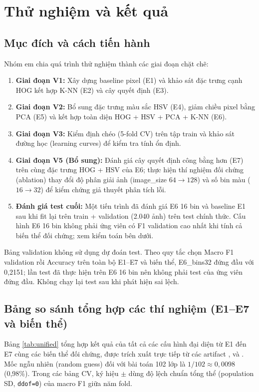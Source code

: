 \chapter{Thử nghiệm và kết quả}
\sloppy
\section{Mục đích và cách tiến hành}
Nhóm em chia quá trình thử nghiệm thành các giai đoạn chặt chẽ:
\begin{enumerate}
    \item \textbf{Giai đoạn V1:} Xây dựng baseline pixel (E1) và khảo sát đặc trưng cạnh HOG kết hợp K-NN (E2) và cây quyết định (E3).
    \item \textbf{Giai đoạn V2:} Bổ sung đặc trưng màu sắc HSV (E4), giảm chiều pixel bằng PCA (E5) và kết hợp toàn diện HOG + HSV + PCA + K-NN (E6).
    \item \textbf{Giai đoạn V3:} Kiểm định chéo (5-fold CV) trên tập train và khảo sát đường học (learning curves) để kiểm tra tính ổn định.
    \item \textbf{Giai đoạn V5 (Bổ sung):} Đánh giá cây quyết định công bằng hơn (E7) trên cùng đặc trưng HOG + HSV của E6; thực hiện thí nghiệm đối chứng (ablation) thay đổi độ phân giải ảnh (image\_size $64 \to 128$) và số bin màu ($16 \to 32$) để kiểm chứng giả thuyết phân tích lỗi.
    \item \textbf{Đánh giá test cuối:} Một tiến trình đã đánh giá E6 16 bin và baseline E1 sau khi fit lại trên train + validation (2.040 ảnh) trên test chính thức. Cấu hình E6 16 bin không phải ứng viên có F1 validation cao nhất khi tính cả biến thể đối chứng; xem kiểm toán bên dưới.
\end{enumerate}

Bảng validation không sử dụng dự đoán test. Theo quy tắc chọn Macro F1 validation rồi Accuracy trên toàn bộ E1–E7 và biến thể, E6\_bins32 đứng đầu với 0,2151; lần test đã thực hiện trên E6 16 bin nên không phải test của ứng viên đứng đầu. Không chạy lại test sau khi phát hiện sai lệch.

\section{Bảng so sánh tổng hợp các thí nghiệm (E1–E7 và biến thể)}
Bảng \ref{tab:unified} tổng hợp kết quả của tất cả các cấu hình đại diện từ E1 đến E7 cùng các biến thể đối chứng, được trích xuất trực tiếp từ các artifact ,  và . Mốc ngẫu nhiên (random guess) đối với bài toán 102 lớp là $1/102 \approx 0,0098$ (0,98\%). Trong các bảng CV, ký hiệu $\pm$ dùng độ lệch chuẩn tổng thể (population SD, \texttt{ddof=0}) của macro F1 giữa năm fold.


